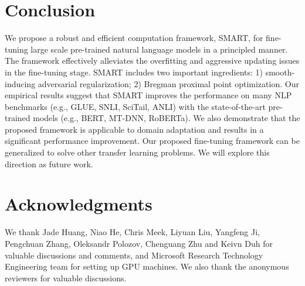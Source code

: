 \documentclass[11pt]{article} \usepackage{url}
\newcommand\model{SMART}
\begin{document}
\section{Conclusion}
\label{sec:conclusion}
\vspace{-0.05in}

We propose a robust and efficient computation framework, {\model}, for fine-tuning large scale pre-trained natural language models in a principled manner. The framework effectively alleviates the overfitting and aggressive updating issues in the fine-tuning stage. 
{\model} includes two important ingredients: 1) smooth-inducing adversarial regularization; 2) Bregman proximal point optimization. 
Our empirical results suggest that {\model} improves the performance on many NLP benchmarks (e.g., GLUE, SNLI, SciTail, ANLI) with the state-of-the-art pre-trained models (e.g., BERT, MT-DNN, RoBERTa). We also demonstrate that the proposed framework is applicable to domain adaptation and results in a significant performance improvement. 
Our proposed fine-tuning framework can be generalized to solve other transfer learning problems. We will explore this direction as future work.  \vspace{-3mm}
\section*{Acknowledgments}
\vspace{-3mm}
We thank Jade Huang, Niao He, Chris Meek, Liyuan Liu, Yangfeng Ji, Pengchuan Zhang, Oleksandr Polozov, Chenguang Zhu and Keivn Duh for valuable discussions and comments, and Microsoft Research Technology Engineering team for setting up GPU machines. We also thank the anonymous reviewers for valuable discussions.  



\clearpage
\end{document}
